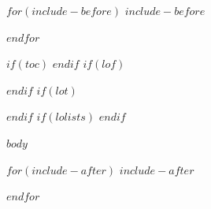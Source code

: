 \documentclass[$if(fontsize)$$fontsize$$else$11pt$endif$,$if(lang)$$babel-lang$,$endif$a4paper,$for(classoption)$$classoption$$sep$,$endfor$]{$documentclass$}
\begin{document}
% 
% 
% 
% 
% 	
% 	

\restoregeometry

$for(include-before)$
$include-before$

$endfor$

\frontmatter    %
$if(toc)$
{%
\setcounter{tocdepth}{$toc-depth$}
\tableofcontents
}
$endif$
$if(lof)$
\listoffigures
$endif$
$if(lot)$
\listoftables
$endif$
$if(lolists)$
\listoflistings
$endif$

$body$

\backmatter      %

\printbibliography[heading=bibintoc]

$for(include-after)$
$include-after$

$endfor$
\end{document}
